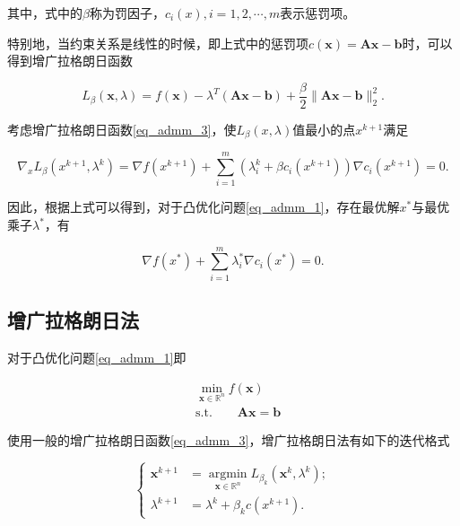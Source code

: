 其中，式中的$\beta$称为罚因子，$c_{i}(x), i=1, 2, \cdots, m$表示惩罚项。

特别地，当约束关系是线性的时候，即上式中的惩罚项$c(\bm{x})=\bm{Ax}-\bm{b}$时，可以得到增广拉格朗日函数

\begin{equation}\label{eq_admm_4}
    L_{\beta}(\bm{x}, \lambda) = f(\bm{x}) - \lambda^{T}(\bm{Ax}-\bm{b})+\frac{\beta}{2}\|\bm{Ax}-\bm{b}\|_{2}^{2}.
\end{equation}

考虑增广拉格朗日函数\ref{eq_admm_3}，使$L_{\beta}(x, \lambda)$值最小的点$x^{k+1}$满足\cite{2016ADMM}

\begin{equation*}
    \nabla_{x} L_{\beta}(x^{k+1}, \lambda^{k}) = \nabla f(x^{k+1}) + \sum_{i=1}^{m} (\lambda_{i}^{k}+\beta c_{i}(x^{k+1})) \nabla c_{i}(x^{k+1}) = 0.
\end{equation*}

因此，根据上式可以得到，对于凸优化问题\ref{eq_admm_1}，存在最优解$x^{*}$与最优乘子$\lambda^{*}$，有

\begin{equation}
    \nabla f(x^{*}) + \sum_{i=1}^{m}\lambda_{i}^{*}\nabla c_{i}(x^{*}) = 0.
\end{equation}

\subsection{增广拉格朗日法}

对于凸优化问题\ref{eq_admm_1}即

\begin{equation*}
    \begin{split}
        &\min\limits_{\bm{x}\in \mathbb{R}^{n}} f(\bm{x}) \\
        &\mathrm{s. t.} \quad\quad \bm{Ax} = \bm{b}
    \end{split}
\end{equation*}

使用一般的增广拉格朗日函数\ref{eq_admm_3}，增广拉格朗日法有如下的迭代格式

\begin{equation}\label{eq_admm_5}
    \begin{cases}
        \bm{x}^{k+1} &= \mathop{\mathrm{argmin}}\limits_{\bm{x}\in \mathbb{R}^{n}} L_{\beta_{k}}(\bm{x}^{k}, \lambda^{k}) ; \\
        \lambda^{k+1} &= \lambda^{k} + \beta_{k} c(x^{k+1}) .
    \end{cases}
\end{equation}

